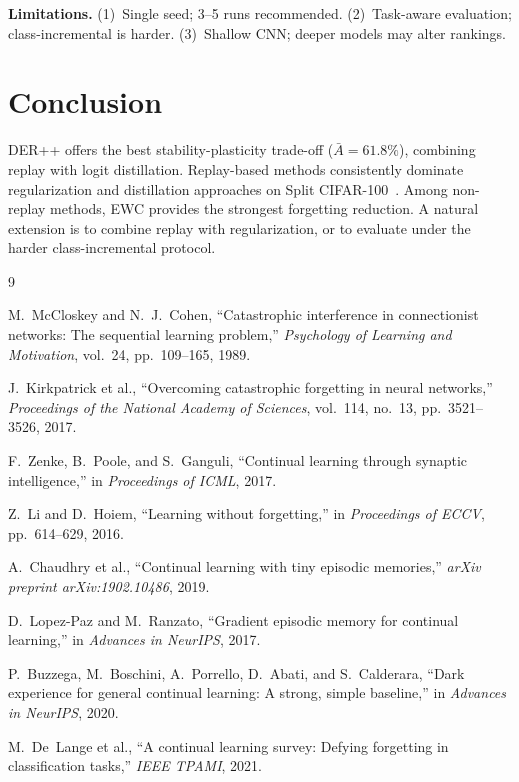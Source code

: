 \documentclass[10pt, a4paper, twocolumn]{article}
\begin{document}
\textbf{Limitations.}
(1)~Single seed; 3--5 runs recommended. (2)~Task-aware evaluation; class-incremental is harder. (3)~Shallow CNN; deeper models may alter rankings.

\section{Conclusion}

DER++ offers the best stability-plasticity trade-off ($\bar{A}\!=\!61.8\%$), combining replay with logit distillation. Replay-based methods consistently dominate regularization and distillation approaches on Split CIFAR-100~\cite{buzzega2020dark, delange2021survey}. Among non-replay methods, EWC provides the strongest forgetting reduction. A natural extension is to combine replay with regularization, or to evaluate under the harder class-incremental protocol.


\begin{thebibliography}{9}
\small

M.~McCloskey and N.~J.~Cohen, ``Catastrophic interference in connectionist networks: The sequential learning problem,'' \textit{Psychology of Learning and Motivation}, vol.~24, pp.~109--165, 1989.

J.~Kirkpatrick et al., ``Overcoming catastrophic forgetting in neural networks,'' \textit{Proceedings of the National Academy of Sciences}, vol.~114, no.~13, pp.~3521--3526, 2017.

F.~Zenke, B.~Poole, and S.~Ganguli, ``Continual learning through synaptic intelligence,'' in \textit{Proceedings of ICML}, 2017.

Z.~Li and D.~Hoiem, ``Learning without forgetting,'' in \textit{Proceedings of ECCV}, pp.~614--629, 2016.

A.~Chaudhry et al., ``Continual learning with tiny episodic memories,'' \textit{arXiv preprint arXiv:1902.10486}, 2019.

D.~Lopez-Paz and M.~Ranzato, ``Gradient episodic memory for continual learning,'' in \textit{Advances in NeurIPS}, 2017.

P.~Buzzega, M.~Boschini, A.~Porrello, D.~Abati, and S.~Calderara, ``Dark experience for general continual learning: A strong, simple baseline,'' in \textit{Advances in NeurIPS}, 2020.

M.~De~Lange et al., ``A continual learning survey: Defying forgetting in classification tasks,'' \textit{IEEE TPAMI}, 2021.

\end{thebibliography}
\end{document}
